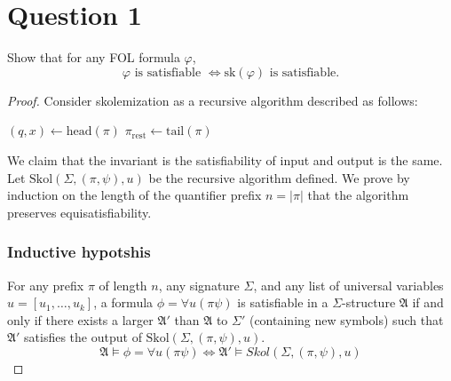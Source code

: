 \documentclass{article}
\begin{document}
\section*{Question 1}
Show that for any FOL formula $\varphi$,
\[
\varphi \text{ is satisfiable } \iff \mathrm{sk}(\varphi) \text{ is satisfiable}.
\]

\begin{proof}
    Consider skolemization as a recursive algorithm described as follows:\\
\begin{algorithm}[H]
    \caption{Skolemization on Prenex Formula}
    
    
    $(q, x) \gets \text{head}(\pi)$\;
    $\pi_{\text{rest}} \gets \text{tail}(\pi)$
    
\end{algorithm}
We claim that the invariant is the satisfiability of input and output is the same.
Let $\text{Skol}(\Sigma, (\pi, \psi), u)$ be the recursive algorithm defined. 
We prove by induction on the length of the quantifier prefix $n = |\pi|$ that the algorithm preserves equisatisfiability.
\subsubsection*{Inductive hypotshis}
For any prefix $\pi$ of length $n$, any signature $\Sigma$, and any list of universal variables $u = [u_1, \dots, u_k]$, 
a formula $\phi = \forall u (\pi \psi)$ is satisfiable in a $\Sigma$-structure $\mathfrak{A}$ 
if and only if there exists a larger $\mathfrak{A}'$ than $\mathfrak{A}$ to $\Sigma'$ (containing new symbols) 
such that $\mathfrak{A}'$ satisfies the output of $\text{Skol}(\Sigma, (\pi, \psi), u)$.
\[\mathfrak{A} \models \phi = \forall u (\pi \psi) \iff \mathfrak{A}' \models {Skol}(\Sigma, (\pi, \psi), u)\]


\end{proof}
\end{document}
